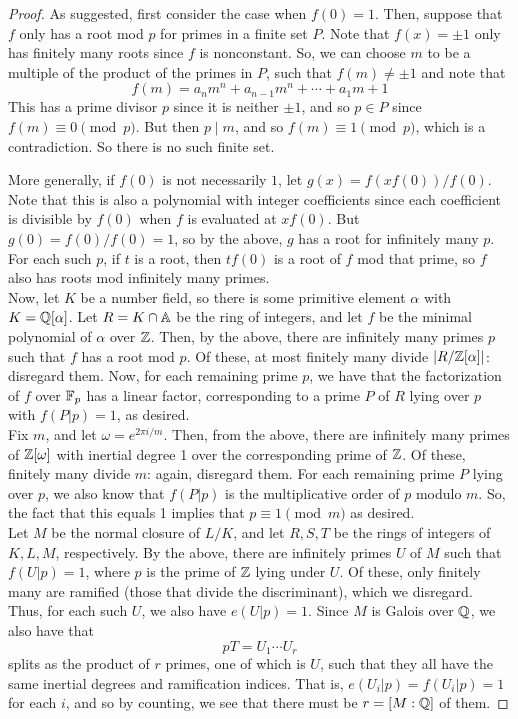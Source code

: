 \begin{proof}
	As suggested, first consider the case when $f(0) = 1$. Then, suppose that $f$ only has a root mod $p$ for primes in a finite set $P$. Note that $f(x) = \pm 1$ only has finitely many roots since $f$ is nonconstant. So, we can choose $m$ to be a multiple of the product of the primes in $P$, such that $f(m) \neq \pm 1$ and note that
	\[ f(m) = a_nm^n + a_{n-1}m^n + \cdots + a_1m + 1 \]
	This has a prime divisor $p$ since it is neither $\pm 1$, and so $p \in P$ since $f(m) \equiv 0 \pmod{p}$. But then $p \mid m$, and so $f(m) \equiv 1 \pmod{p}$, which is a contradiction. So there is no such finite set.
	
	More generally, if $f(0)$ is not necessarily $1$, let $g(x) = f(xf(0))/f(0)$. Note that this is also a polynomial with integer coefficients since each coefficient is divisible by $f(0)$ when $f$ is evaluated at $xf(0)$. But $g(0) = f(0)/f(0) = 1$, so by the above, $g$ has a root for infinitely many $p$. For each such $p$, if $t$ is a root, then $tf(0)$ is a root of $f$ mod that prime, so $f$ also has roots mod infinitely many primes. \\
	
	Now, let $K$ be a number field, so there is some primitive element $\alpha$ with $K = \QQ[\alpha]$. Let $R = K \cap \AA$ be the ring of integers, and let $f$ be the minimal polynomial of $\alpha$ over $\ZZ$. Then, by the above, there are infinitely many primes $p$ such that $f$ has a root mod $p$. Of these, at most finitely many divide $|R/\ZZ[\alpha]|$: disregard them. Now, for each remaining prime $p$, we have that the factorization of $f$ over $\FF_p$ has a linear factor, corresponding to a prime $P$ of $R$ lying over $p$ with $f(P|p) = 1$, as desired. \\
	
	Fix $m$, and let $\omega = e^{2\pi i/m}$. Then, from the above, there are infinitely many primes of $\ZZ[\omega]$ with inertial degree 1 over the corresponding prime of $\ZZ$. Of these, finitely many divide $m$: again, disregard them. For each remaining prime $P$ lying over $p$, we also know that $f(P|p)$ is the multiplicative order of $p$ modulo $m$. So, the fact that this equals 1 implies that $p \equiv 1 \pmod{m}$ as desired. \\
	
	Let $M$ be the normal closure of $L/K$, and let $R,S,T$ be the rings of integers of $K,L,M$, respectively. By the above, there are infinitely primes $U$ of $M$ such that $f(U|p)=1$, where $p$ is the prime of $\ZZ$ lying under $U$. Of these, only finitely many are ramified (those that divide the discriminant), which we disregard. Thus, for each such $U$, we also have $e(U|p) = 1$. Since $M$ is Galois over $\QQ$, we also have that
	\[ pT = U_1 \cdots U_r \]
	splits as the product of $r$ primes, one of which is $U$, such that they all have the same inertial degrees and ramification indices. That is, $e(U_i|p)=f(U_i|p)=1$ for each $i$, and so by counting, we see that there must be $r=[M:\QQ]$ of them.
	

\end{proof}
